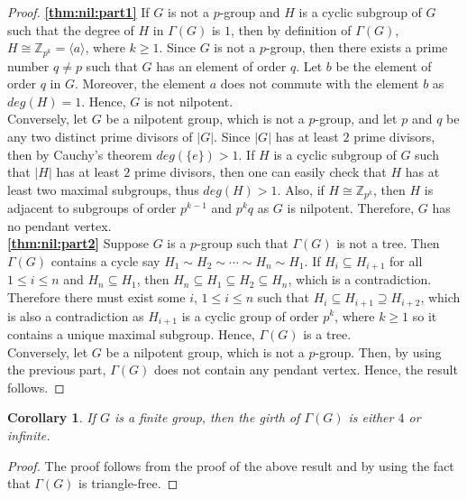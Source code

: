 \documentclass[11pt,twoside]{amsart}
\def \Z {{\mathbb{Z}}}
\newtheorem{cor}[theorem]{Corollary}
\begin{document}
\begin{proof}
\textbf{\ref{thm:nil:part1}} If $G$ is not a $p$-group and $H$ is a cyclic subgroup of $G$ such that the degree of $H$ in $\Gamma (G)$ is $1$, then by definition of $\Gamma (G)$, $H\cong \Z_{p^k}=\langle a \rangle$, where $k\geq 1$. Since $G$ is not a $p$-group, then there exists a prime number $q\not =p$ such that $G$ has an element of order $q$. Let $b$ be the element of order $q$ in $G$. Moreover, the element $a$ does not commute with the element $b$ as $deg (H)=1$. Hence, $G$ is not nilpotent.\\
Conversely, let $G$ be a nilpotent group, which is not a $p$-group, and let $p$ and $q$ be any two distinct prime divisors of $|G|$. Since $|G|$ has at least $2$ prime divisors, then by Cauchy's theorem $deg (\{e\})>1$. If $H$ is a cyclic subgroup of $G$ such that $|H|$ has at least $2$ prime divisors, then one can easily check that $H$ has at least two maximal subgroups, thus $deg (H)>1$. Also, if $H\cong \Z_{p^k}$, then $H$ is adjacent to subgroups of order $p^{k-1}$ and $p^kq$ as $G$ is nilpotent. Therefore, $G$ has no pendant vertex.\\

\textbf{\ref{thm:nil:part2}} Suppose $G$ is a $p$-group such that $\Gamma (G)$ is not a tree. Then $\Gamma (G)$ contains a cycle say $H_1\sim H_2\sim \cdots \sim H_n \sim H_1$. If $H_i\subseteq H_{i+1}$ for all $1\leq i \leq n$ and $H_n\subseteq H_1$, then $H_n\subseteq H_1 \subseteq H_2\subseteq H_n$, which is a contradiction. Therefore there must exist some $i$,  $1\leq i \leq n$ such that
$H_i\subseteq H_{i+1} \supseteq H_{i+2}$, which is also a contradiction as $H_{i+1}$ is a cyclic group of order $p^k$, where $k\geq 1$ so it contains a unique maximal subgroup. Hence, $\Gamma (G)$ is a tree.\\
Conversely, let $G$ be a nilpotent group, which is not a $p$-group. Then, by using the previous part, $\Gamma (G)$ does not contain any pendant vertex. Hence, the result follows.
\end{proof}
\begin{cor}\label{cor:girth }
   If $G$ is a finite group, then the girth of $\Gamma (G)$ is either $4$ or infinite. 
\end{cor}
\begin{proof}
The proof follows from the proof of the above result and by using the fact that $\Gamma (G)$ is triangle-free.
\end{proof}
\end{document}

